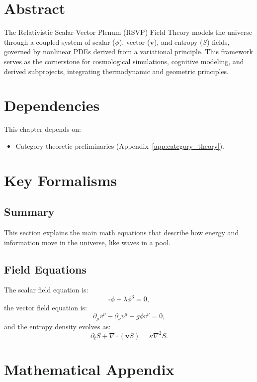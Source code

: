 \documentclass[11pt,oneside]{memoir}
\theoremstyle{plain}
\begin{document}
\section{Abstract}
The Relativistic Scalar-Vector Plenum (RSVP) Field Theory models the universe through a coupled system of scalar (\(\phi\)), vector (\(\mathbf{v}\)), and entropy (\(S\)) fields, governed by nonlinear PDEs derived from a variational principle. This framework serves as the cornerstone for cosmological simulations, cognitive modeling, and derived subprojects, integrating thermodynamic and geometric principles.

\section{Dependencies}
This chapter depends on:
\begin{itemize}
    \item Category-theoretic preliminaries (Appendix~\ref{app:category_theory}).
\end{itemize}

\section{Key Formalisms}
\subsection{Summary}
This section explains the main math equations that describe how energy and information move in the universe, like waves in a pool.

\subsection{Field Equations}
The scalar field equation is:
\begin{equation}
    \square \phi + \lambda \phi^3 = 0,
\end{equation}
the vector field equation is:
\begin{equation}
    \partial_\mu v^\nu - \partial_\nu v^\mu + g \phi v^\nu = 0,
\end{equation}
and the entropy density evolves as:
\begin{equation}
    \partial_t S + \nabla \cdot (\mathbf{v} S) = \kappa \nabla^2 S.
\end{equation}

\section{Mathematical Appendix}
\end{document}
